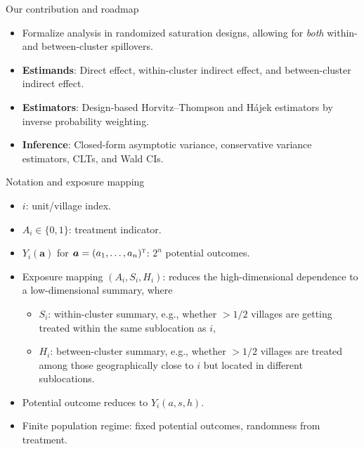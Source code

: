 \documentclass[aspectratio=169]{beamer}
\def\T{{\textsc{t}}}
\newcommand{\ba}{\boldsymbol{a}}
\begin{document}
\begin{frame}{Our contribution and roadmap}
\begin{itemize}
    \item Formalize analysis in randomized saturation designs, allowing for \emph{both} within- and between-cluster spillovers.
    \pause
    \item \textbf{Estimands}: Direct effect, within-cluster indirect effect, and between-cluster indirect effect.
    \pause
    \item \textbf{Estimators}: Design-based Horvitz--Thompson and H\'{a}jek estimators by inverse probability weighting.
    \pause
    \item \textbf{Inference}: Closed-form asymptotic variance, conservative variance estimators, CLTs, and Wald CIs. 
\end{itemize}  
\end{frame}


\begin{frame}{Notation and exposure mapping}
\begin{itemize}
\item $i$: unit/village index.
\item $A_i\in\{0,1\}$: treatment indicator.
\item $Y_i(\ba)$ for $\ba = (a_1,\ldots,a_n)^{\T}$: $2^n$ potential outcomes.
\pause
\item Exposure mapping $(A_i, S_i, H_i)$: reduces the high-dimensional dependence to a low-dimensional summary, where
\pause
\begin{itemize}
    \item $S_i$: within-cluster summary, e.g., whether $>1/2$ villages are getting treated within the same sublocation as $i$,
    \pause
    \item $H_i$: between-cluster summary, e.g., whether $>1/2$ villages are treated among those geographically close to $i$ but located in different sublocations.
\end{itemize}
\pause
\item Potential outcome reduces to $Y_i(a,s,h)$.
\pause
\item Finite population regime: fixed potential outcomes, randomness from treatment.
\end{itemize}
\end{frame}
\end{document}
